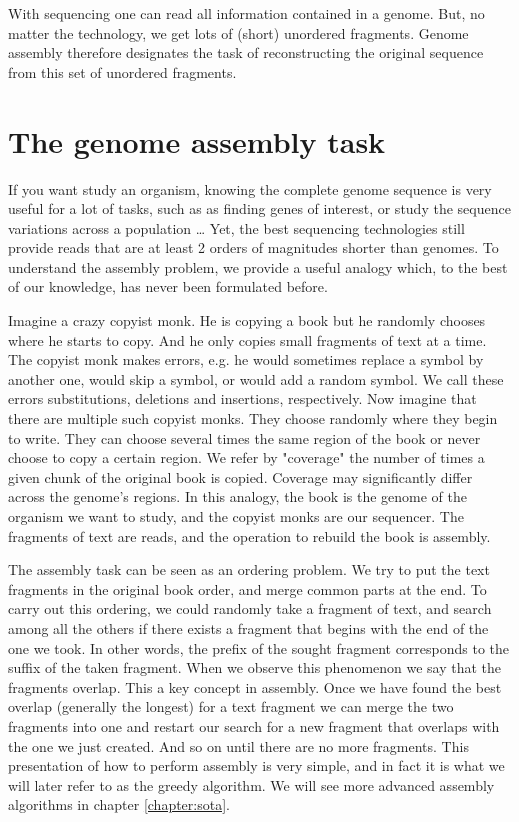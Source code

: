 \documentclass[./main.tex]{subfiles}
\begin{document}
With sequencing one can read all information contained in a genome. But, no matter the technology, we get lots of (short) unordered fragments. Genome assembly therefore designates the task of reconstructing the original sequence from this set of unordered fragments. %

\section{The genome assembly task}

If you want study an organism, knowing the complete genome sequence is very useful for a lot of tasks, such as as finding 
genes of interest, or study the sequence variations across a population \ldots %
Yet, the best sequencing technologies still provide reads that are at least 2 orders of magnitudes shorter than genomes. To understand the assembly problem, we provide a useful analogy which, to the best of our knowledge, has never been formulated before.

Imagine a crazy copyist monk. He is copying a book but he randomly chooses where he starts to copy. And he only copies small fragments of text at a time.
The copyist monk makes errors, e.g. he would sometimes replace a symbol by another one, would skip a symbol, or would add a random symbol. We call these errors substitutions, deletions and insertions, respectively.
Now imagine that there are multiple such copyist monks.
They choose randomly where they begin to write. They can choose several times the same region of the book or never choose to copy a certain region.
We refer by "coverage" the number of times a given chunk of the original book is copied. Coverage may significantly differ across the genome's regions. %
In this analogy, the book is the genome of the organism we want to study, and the copyist monks are our sequencer. The fragments of text are reads, and the operation to rebuild the book is assembly.

The assembly task can be seen as an ordering problem. %
We try to put the text fragments in the original book order, and merge common parts at the end. %
To carry out this ordering, we could randomly take a fragment of text, and search among all the others if there exists a fragment that begins with the end of the one we took. In other words, the prefix of the sought fragment corresponds to the suffix of the taken fragment. When we observe this phenomenon we say that the fragments overlap. This a key concept in assembly. Once we have found the best overlap (generally the longest) for a text fragment we can merge the two fragments into one and restart our search for a new fragment that overlaps with the one we just created. And so on until there are no more fragments. This presentation of how to perform assembly is very simple, and in fact it is what we will later refer to as the greedy algorithm. We will see more advanced assembly algorithms in chapter \ref{chapter:sota}.
\end{document}
